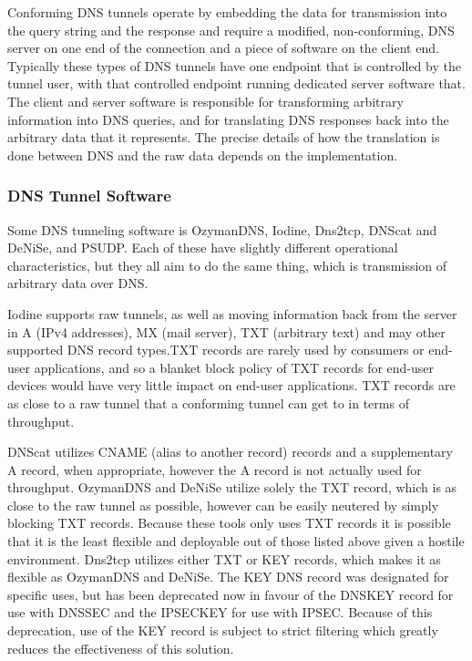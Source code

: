 \documentclass[12pt]{report}
\theoremstyle{remark}
\theoremstyle{definition}
\theoremstyle{definition}
\theoremstyle{definition}
\begin{document}
Conforming DNS tunnels operate by embedding the data for transmission into the
query string and the response and require a modified, non-conforming, DNS
server on one end of the connection and a piece of software on the client end.
Typically these types of DNS tunnels have one endpoint that is controlled by the 
tunnel user, with that controlled endpoint running dedicated server software
that. The client and server software is responsible for transforming arbitrary
information into DNS queries, and for translating DNS responses back into the
arbitrary data that it represents. The precise details of how the translation
is done between DNS and the raw data depends on the implementation.

\subsubsection{DNS Tunnel Software}

Some DNS tunneling software is OzymanDNS\cite{ozymandnssrc},
Iodine\cite{iodinesrc},
Dns2tcp\cite{dns2tcpsrc},
DNScat\cite{dnscatsrc} and
DeNiSe\cite{denisesrc}, and
PSUDP\cite{psudpsrc}. Each of these have
slightly different operational characteristics, but they all aim to do the same
thing, which is transmission of arbitrary data over DNS.

Iodine supports raw tunnels, as well as moving information back from the server
in A (IPv4 addresses), MX (mail server), TXT (arbitrary text) and may other
supported DNS record types.TXT records are rarely used by
consumers or end-user applications, and so a blanket block policy of TXT
records for end-user devices would have very little impact on end-user
applications. TXT records are as close to a raw tunnel that a conforming
tunnel can get to in terms of throughput.

DNScat utilizes CNAME (alias to
another record) records and a supplementary A record, when appropriate, however
the A record is not actually used for throughput. OzymanDNS and DeNiSe utilize
solely the
TXT record, which is as close to the raw tunnel as possible, however can be
easily neutered by simply blocking TXT records. Because these tools only uses
TXT records it is possible that it is the least flexible and deployable out of
those listed above given a hostile environment. Dns2tcp utilizes either TXT or
KEY records, which makes it as flexible as OzymanDNS and DeNiSe. The KEY DNS
record was designated for specific uses\cite{rfc2931}, but has been
deprecated now\cite{rfc3445} in favour of the DNSKEY record for use with
DNSSEC\cite{rfc3755} and the IPSECKEY for use with
IPSEC\cite{rfc4025}. Because of this deprecation, use of the KEY record is
subject to strict filtering which greatly reduces the effectiveness of this
solution.
\end{document}
